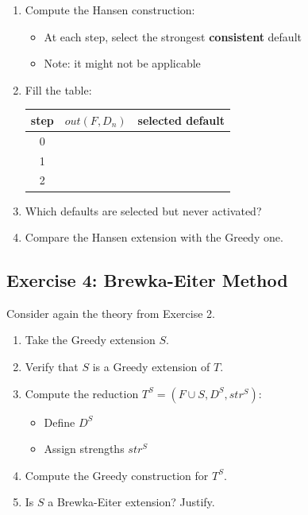 \documentclass[11pt]{article}
\begin{document}
\begin{enumerate}
    \item Compute the Hansen construction:
    \begin{itemize}
        \item At each step, select the strongest \textbf{consistent} default
        \item Note: it might not be applicable
    \end{itemize}

    \item Fill the table:

    \begin{center}
    \begin{tabular}{c|c|c}
        step & $out(F, D_n)$ & selected default \\
        \hline
        0 & & \\
        1 & & \\
        2 & & \\
    \end{tabular}
    \end{center}

    \item Which defaults are selected but never activated?

    \item Compare the Hansen extension with the Greedy one.
\end{enumerate}

\subsection{Exercise 4: Brewka-Eiter Method}

Consider again the theory from Exercise 2.

\begin{enumerate}
    \item Take the Greedy extension $S$.

    \item Verify that $S$ is a Greedy extension of $T$.

    \item Compute the reduction $T^S = (F \cup S, D^S, str^S)$:
    \begin{itemize}
        \item Define $D^S$
        \item Assign strengths $str^S$
    \end{itemize}

    \item Compute the Greedy construction for $T^S$.

    \item Is $S$ a Brewka-Eiter extension? Justify.
\end{enumerate}
\end{document}
